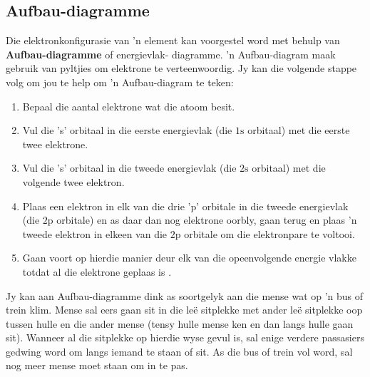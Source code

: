 \subsection*{Aufbau-diagramme}        
\label{m38741*id259628}Die elektronkonfigurasie van  'n element kan voorgestel word met behulp van \textbf{Aufbau-diagramme} of energievlak- diagramme.  'n Aufbau-diagram maak gebruik van pyltjies om elektrone te verteenwoordig. Jy kan die volgende stappe volg om jou te help om  'n Aufbau-diagram te teken:\par 
        \label{m38741*id259639}\begin{enumerate}[noitemsep, label=\textbf{\arabic*}. ] 
            \label{m38741*uid96}\item Bepaal die aantal elektrone wat die atoom besit.
\label{m38741*uid97}\item Vul die 's' orbitaal in die eerste energievlak (die $1\text{s}$ orbitaal) met die eerste twee elektrone.
\label{m38741*uid98}\item Vul die 's' orbitaal in die tweede energievlak (die $2\text{s}$ orbitaal) met die volgende twee elektron.
\label{m38741*uid99}\item Plaas een elektron in elk van die drie 'p' orbitale in die tweede energievlak (die $2\text{p}$ orbitale) en as daar dan nog elektrone oorbly, gaan terug en plaas  'n tweede elektron in elkeen van die $2\text{p}$ orbitale om die elektronpare te voltooi.
\label{m38741*uid100}\item Gaan voort op hierdie manier deur elk van die opeenvolgende energie vlakke totdat al die elektrone geplaas is .
\end{enumerate}

        

\label{m38741*eip-873}Jy kan aan Aufbau-diagramme dink as soortgelyk aan die mense wat op  'n bus of trein klim. Mense sal eers gaan sit in die leë sitplekke met ander leë sitplekke oop tussen hulle en die ander mense (tensy hulle mense ken en dan langs hulle gaan sit). Wanneer al die sitplekke op hierdie wyse gevul is, sal enige verdere passasiers gedwing word om langs iemand te staan ​of sit. As die bus of trein vol word, sal nog meer mense moet staan ​om in te pas.\par \label{m38741*id259728}

